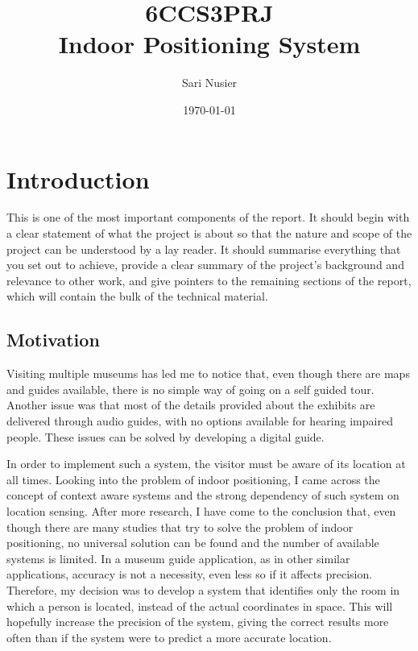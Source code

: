 \documentclass[12pt]{informatics-report}
\title{6CCS3PRJ\\\vspace{0.2cm}Indoor Positioning System}
\author{Sari Nusier}
\date{\today}
\begin{document}
\createFrontMatter
\onehalfspacing
\tableofcontents
\doublespacing


\chapter{Introduction}
This is one of the most important components of the report. It should begin with a clear statement of what the project is about so that the nature and scope of the project can be understood by a lay reader. It should summarise everything that you set out to achieve, provide a clear summary of the project's background and relevance to other work, and give pointers to the remaining sections of the report, which will contain the bulk of the technical material.

\section{Motivation}
Visiting multiple museums has led me to notice that, even though there are maps and guides available, there is no simple way of going on a self guided tour. Another issue was that most of the details provided about the exhibits are delivered through audio guides, with no options available for hearing impaired people. These issues can be solved by developing a digital guide.

In order to implement such a system, the visitor must be aware of its location at all times. Looking into the problem of indoor positioning, I came across the concept of context aware systems and the strong dependency of such system on location sensing. After more research, I have come to the conclusion that, even though there are many studies that try to solve the problem of indoor positioning, no universal solution can be found and the number of available systems is limited. In a museum guide application, as in other similar applications, accuracy is not a necessity, even less so if it affects precision. Therefore, my decision was to develop a system that identifies only the room in which a person is located, instead of the actual coordinates in space. This will hopefully increase the precision of the system, giving the correct results more often than if the system were to predict a more accurate location.
\end{document}
